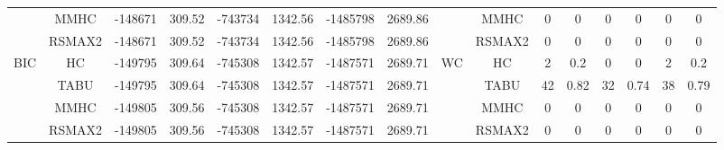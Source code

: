 \begin{table}[h]
{\begin{tabular}{cc||cc|cc|cc||cc|cc|cc|cc}
& MMHC &	-148671 & 	309.52 & 	-743734 & 	1342.56 & 	-1485798 & 	2689.86 & 	& MMHC &	0 & 	0 & 	0 & 	0 & 	0 & 	0\tabularnewline													
& RSMAX2 &	-148671 & 	309.52 & 	-743734 & 	1342.56 & 	-1485798 & 	2689.86 & 	& RSMAX2 &	0 & 	0 & 	0 & 	0 & 	0 & 	0\tabularnewline													
\hline																										
\multirow{4}{*}{BIC} & HC &	-149795 & 	309.64 & 	-745308 & 	1342.57 & 	-1487571 & 	2689.71 & 	\multirow{4}{*}{WC} & HC &	2 & 	0.2 & 	0 & 	0 & 	2 & 	0.2\tabularnewline													
& TABU &	-149795 & 	309.64 & 	-745308 & 	1342.57 & 	-1487571 & 	2689.71 & 	& TABU &	42 & 	0.82 & 	32 & 	0.74 & 	38 & 	0.79\tabularnewline													
& MMHC &	-149805 & 	309.56 & 	-745308 & 	1342.57 & 	-1487571 & 	2689.71 & 	& MMHC &	0 & 	0 & 	0 & 	0 & 	0 & 	0\tabularnewline													
& RSMAX2 &	-149805 & 	309.56 & 	-745308 & 	1342.57 & 	-1487571 & 	2689.71 & 	& RSMAX2 &	0 & 	0 & 	0 & 	0 & 	0 & 	0\tabularnewline													
\hline																										
\end{tabular}																										
}																										
\end{table}																										


